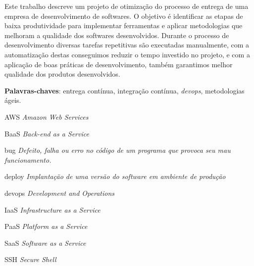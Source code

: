 \documentclass[
	12pt,				%
	openright,			%
	twoside,			%
	a4paper,			%
	english,			%
	french,				%
	spanish,			%
	brazil,				%
	]{abntex2}
\begin{document}

\frenchspacing 


\imprimircapa

\imprimirfolhaderosto*



\setlength{\absparsep}{18pt} %
\begin{resumo}
 Este trabalho descreve um projeto de otimização do processo de entrega de uma empresa de desenvolvimento de softwares. O objetivo é identificar as etapas de baixa produtividade para implementar ferramentas e aplicar metodologias que melhoram a qualidade dos softwares desenvolvidos. Durante o processo de desenvolvimento diversas tarefas repetitivas são executadas manualmente, com a automatização destas conseguimos reduzir o tempo investido no projeto, e com a aplicação de boas práticas de desenvolvimento, também garantimos melhor qualidade dos produtos desenvolvidos.

 \noindent
 \textbf{Palavras-chaves}: entrega contínua, integração contínua, \textit{devops}, metodologias ágeis.
\end{resumo}


\listoftables*

\begin{siglas}
	\item[AWS] \textit{Amazon Web Services}
	\item[BaaS] \textit{Back-end as a Service}
	\item[bug] \textit{Defeito, falha ou erro no código de um programa que provoca seu mau funcionamento.}
	\item[deploy] \textit{Implantação de uma versão do software em ambiente de produção}
	\item[devops] \textit{Development and Operations}
	\item[IaaS] \textit{Infrastructure as a Service}
	\item[PaaS] \textit{Platform as a Service}
	\item[SaaS] \textit{Software as a Service}
	\item[SSH] \textit{Secure Shell}
\end{siglas}
\end{document}
